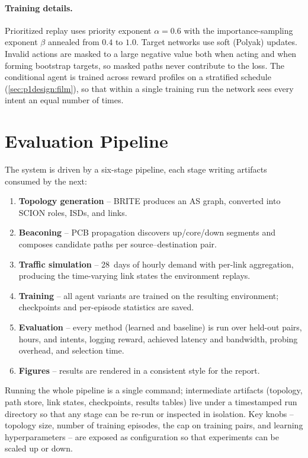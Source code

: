 \paragraph{Training details.} Prioritized replay uses priority exponent $\alpha = 0.6$ with the
importance-sampling exponent $\beta$ annealed from $0.4$ to $1.0$. Target networks use soft (Polyak)
updates. Invalid actions are masked to a large negative value both when acting and when forming
bootstrap targets, so masked paths never contribute to the loss. The conditional agent is trained across
reward profiles on a stratified schedule (\cref{sec:p1design:film}), so that within a single training run
the network sees every intent an equal number of times.

\section{Evaluation Pipeline}
\label{sec:p1impl:pipeline}

The system is driven by a six-stage pipeline, each stage writing artifacts consumed by the next:

\begin{enumerate}
  \item \textbf{Topology generation} -- BRITE produces an AS graph, converted into SCION roles, ISDs, and
  links.
  \item \textbf{Beaconing} -- PCB propagation discovers up/core/down segments and composes candidate paths
  per source--destination pair.
  \item \textbf{Traffic simulation} -- 28~days of hourly demand with per-link aggregation, producing the
  time-varying link states the environment replays.
  \item \textbf{Training} -- all agent variants are trained on the resulting environment; checkpoints and
  per-episode statistics are saved.
  \item \textbf{Evaluation} -- every method (learned and baseline) is run over held-out pairs, hours, and
  intents, logging reward, achieved latency and bandwidth, probing overhead, and selection time.
  \item \textbf{Figures} -- results are rendered in a consistent style for the report.
\end{enumerate}

Running the whole pipeline is a single command; intermediate artifacts (topology, path store, link
states, checkpoints, results tables) live under a timestamped run directory so that any stage can be
re-run or inspected in isolation. Key knobs -- topology size, number of training episodes, the cap on
training pairs, and learning hyperparameters -- are exposed as configuration so that experiments can be
scaled up or down.

